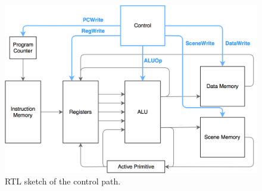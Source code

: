 \begin{figure}[h!]
    \includegraphics[width=\linewidth]{images/Control_signals.png}
    \caption{RTL sketch of the control path.}
    \label{fig:controlpath}
\end{figure}


